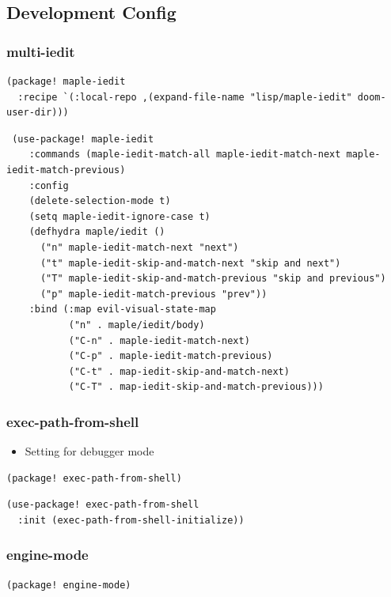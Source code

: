 \documentclass[11pt]{article}
\begin{document}
\subsection{Development Config}
\label{sec:org9b7cfd9}
\subsubsection{multi-iedit}
\label{sec:orga7e1c22}
\begin{verbatim}
(package! maple-iedit
  :recipe `(:local-repo ,(expand-file-name "lisp/maple-iedit" doom-user-dir)))
\end{verbatim}

\begin{verbatim}
 (use-package! maple-iedit
    :commands (maple-iedit-match-all maple-iedit-match-next maple-iedit-match-previous)
    :config
    (delete-selection-mode t)
    (setq maple-iedit-ignore-case t)
    (defhydra maple/iedit ()
      ("n" maple-iedit-match-next "next")
      ("t" maple-iedit-skip-and-match-next "skip and next")
      ("T" maple-iedit-skip-and-match-previous "skip and previous")
      ("p" maple-iedit-match-previous "prev"))
    :bind (:map evil-visual-state-map
           ("n" . maple/iedit/body)
           ("C-n" . maple-iedit-match-next)
           ("C-p" . maple-iedit-match-previous)
           ("C-t" . map-iedit-skip-and-match-next)
           ("C-T" . map-iedit-skip-and-match-previous)))
\end{verbatim}

\subsubsection{exec-path-from-shell}
\label{sec:org384a15e}
\begin{itemize}
\item Setting for debugger mode
\end{itemize}
\begin{verbatim}
(package! exec-path-from-shell)
\end{verbatim}

\begin{verbatim}
(use-package! exec-path-from-shell
  :init (exec-path-from-shell-initialize))
\end{verbatim}

\subsubsection{engine-mode}
\label{sec:org8a333ac}
\begin{verbatim}
(package! engine-mode)
\end{verbatim}
\end{document}
